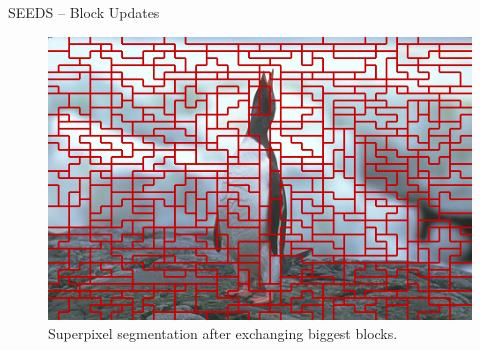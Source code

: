 \documentclass[handout]{beamer}
\begin{document}
%		
%		
%		
%		

	\begin{frame}{SEEDS -- Block Updates}
		\begin{figure}
   			\centering
   			\includegraphics[scale=0.5]{images/bsd-2-after-3}
   			\caption{Superpixel segmentation after exchanging biggest blocks.}
   		\end{figure}
	\end{frame}
\end{document}
